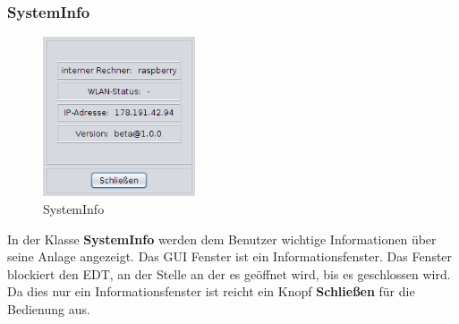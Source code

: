 \newpage

\subsubsection{SystemInfo}
\begin{figure}
\vspace{-20pt}
  \begin{center}
    \includegraphics[width=0.40\textwidth]{Bilder/GUI/SystemInfo}
  \end{center}
  \caption{SystemInfo}
  \label{SystemInfo}
  \vspace{-60pt}
\end{figure}
   
In der Klasse \textbf{SystemInfo} werden dem Benutzer wichtige Informationen über seine Anlage angezeigt. Das GUI Fenster ist ein Informationsfenster. Das Fenster blockiert den EDT, an der Stelle an der es geöffnet wird, bis es geschlossen wird. Da dies nur ein Informationsfenster ist reicht ein Knopf \textbf{Schließen} für die Bedienung aus.

\vspace{10pt}

